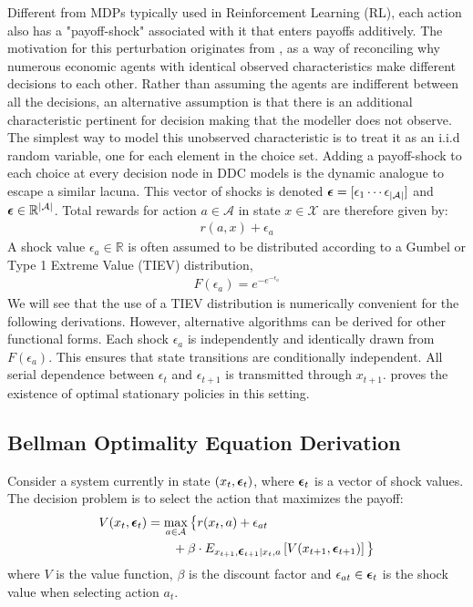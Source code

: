 \documentclass{article}
\renewcommand{\vec}[1]{\mbox{\bm{$#1$}}}
\begin{document}
Different from MDPs typically used in Reinforcement Learning (RL), each action also has a "payoff-shock" associated with it that enters payoffs additively.
The motivation for this perturbation originates from \cite{mcfadden1973conditional}, as a way of reconciling why numerous economic agents with identical observed characteristics make different decisions to each other. Rather than assuming the agents are indifferent between all the decisions, an alternative assumption is that there is an additional characteristic pertinent for decision making that the modeller does not observe. The simplest way to model this unobserved characteristic is to treat it as an i.i.d random variable, one for each element in the choice set. Adding a payoff-shock to each choice at every decision node in DDC models is the dynamic analogue to escape a similar lacuna.
This vector of shocks is denoted $\vec{\epsilon} = [ \epsilon_{1} \cdots \epsilon_{|\mathcal{A}|} ]$ and $\vec{\epsilon}\in \mathbb{R}^{|\mathcal{A}|}$. Total rewards for action $a \in \mathcal{A}$ in state $x \in \mathcal{X}$ are therefore given by:
\begin{eqnarray}
r(a,x)+\epsilon_a
\end{eqnarray}
A shock value $\epsilon_a\in\mathbb{R}$ is often assumed to be distributed according to a Gumbel or Type 1 Extreme Value (TIEV) distribution,
\begin{align}
F(\epsilon_a)=e^{-e^{-\epsilon_a}}
\end{align}
We will see that the use of a TIEV distribution is numerically convenient for the following derivations. However, alternative algorithms can be derived for other functional forms. Each shock $\epsilon_a$ is independently and identically drawn from $F(\epsilon_a)$. This ensures that state transitions are conditionally independent. All serial dependence between $\epsilon_{t}$ and $\epsilon_{t+1}$ is transmitted through $x_{t+1}$. \cite{rust_theory} proves the existence of optimal stationary policies in this setting.

\subsection{Bellman Optimality Equation Derivation}

Consider a system currently in state $(x_t,\vec{\epsilon}_t)$, where $\vec{\epsilon}_t$ is a vector of shock values. The decision problem is to select the action that maximizes the payoff:
\begin{align}
\begin{split}
V(x_t,\vec{\epsilon}_t) & = \max_{a\in\mathcal{A}} \big\{r(x_t,a)+\epsilon_{at} \\
& \qquad + \beta \cdot E_{x_{t+1},\vec{\epsilon}_{t+1}|x_t,a} \left[V(x_{t+1},\vec{\epsilon}_{t+1})\right] \big\} \\
\end{split}
\end{align} 
where $V$ is the value function, $\beta$ is the discount factor and $\epsilon_{at} \in \vec{\epsilon}_t$ is the shock value when selecting action $a_t$.
\end{document}
